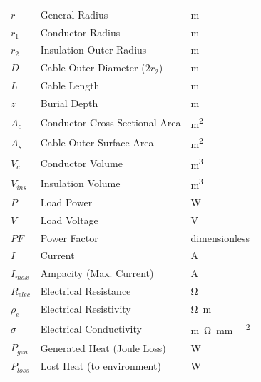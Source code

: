 \documentclass[11pt, a4paper]{article}
\begin{document}
\begin{longtable}{@{}l l l@{}}
    \addlinespace %
    $r$ & General Radius & \si{\metre} \\
    $r_1$ & Conductor Radius & \si{\metre} \\
    $r_2$ & Insulation Outer Radius & \si{\metre} \\
    $D$ & Cable Outer Diameter ($2r_2$) & \si{\metre} \\
    $L$ & Cable Length & \si{\metre} \\
    $z$ & Burial Depth & \si{\metre} \\
    $A_c$ & Conductor Cross-Sectional Area & \si{\square\metre} \\
    $A_s$ & Cable Outer Surface Area & \si{\square\metre} \\
    $V_c$ & Conductor Volume & \si{\cubic\metre} \\
    $V_{ins}$ & Insulation Volume & \si{\cubic\metre} \\
    
    \addlinespace %
    $P$ & Load Power & \si{\watt} \\
    $V$ & Load Voltage & \si{\volt} \\
    $PF$ & Power Factor & dimensionless \\
    $I$ & Current & \si{\ampere} \\
    $I_{max}$ & Ampacity (Max. Current) & \si{\ampere} \\
    $R_{elec}$ & Electrical Resistance & \si{\ohm} \\
    $\rho_e$ & Electrical Resistivity & \si{\ohm\metre} \\
    $\sigma$ & Electrical Conductivity & \si{\metre\per\ohm\per\square\mm} \\
    
    \addlinespace %
    $P_{gen}$ & Generated Heat (Joule Loss) & \si{\watt} \\
    $P_{loss}$ & Lost Heat (to environment) & \si{\watt} \\
    

\end{longtable}
\end{document}
